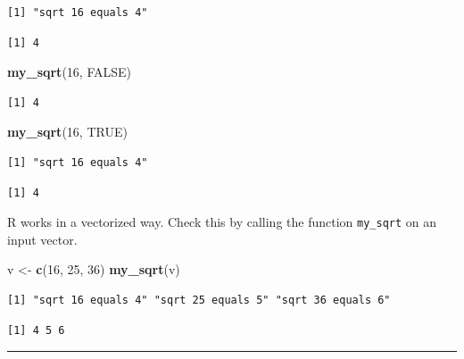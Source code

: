 \documentclass[
]{book}
\newenvironment{Shaded}{\begin{snugshade}}{\end{snugshade}}
\newcommand{\DecValTok}[1]{\textcolor[rgb]{0.00,0.00,0.81}{#1}}
\newcommand{\KeywordTok}[1]{\textcolor[rgb]{0.13,0.29,0.53}{\textbf{#1}}}
\newcommand{\NormalTok}[1]{#1}
\newcommand{\OtherTok}[1]{\textcolor[rgb]{0.56,0.35,0.01}{#1}}
\newcommand{\StringTok}[1]{\textcolor[rgb]{0.31,0.60,0.02}{#1}}
\begin{document}
\begin{verbatim}
[1] "sqrt 16 equals 4"
\end{verbatim}

\begin{verbatim}
[1] 4
\end{verbatim}

\begin{Shaded}
\begin{Highlighting}[]
\KeywordTok{my_sqrt}\NormalTok{(}\DecValTok{16}\NormalTok{, }\OtherTok{FALSE}\NormalTok{)}
\end{Highlighting}
\end{Shaded}

\begin{verbatim}
[1] 4
\end{verbatim}

\begin{Shaded}
\begin{Highlighting}[]
\KeywordTok{my_sqrt}\NormalTok{(}\DecValTok{16}\NormalTok{, }\OtherTok{TRUE}\NormalTok{)}
\end{Highlighting}
\end{Shaded}

\begin{verbatim}
[1] "sqrt 16 equals 4"
\end{verbatim}

\begin{verbatim}
[1] 4
\end{verbatim}

R works in a vectorized way. Check this by calling the function \texttt{my\_sqrt} on an input vector.

\begin{Shaded}
\begin{Highlighting}[]
\NormalTok{v <-}\StringTok{ }\KeywordTok{c}\NormalTok{(}\DecValTok{16}\NormalTok{, }\DecValTok{25}\NormalTok{, }\DecValTok{36}\NormalTok{)}
\KeywordTok{my_sqrt}\NormalTok{(v)}
\end{Highlighting}
\end{Shaded}

\begin{verbatim}
[1] "sqrt 16 equals 4" "sqrt 25 equals 5" "sqrt 36 equals 6"
\end{verbatim}

\begin{verbatim}
[1] 4 5 6
\end{verbatim}

\begin{center}\rule{0.5\linewidth}{0.5pt}\end{center}
\end{document}
